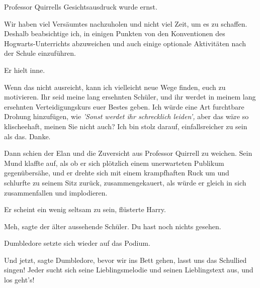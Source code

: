 Professor Quirrells Gesichtsausdruck wurde ernst.

\glqq Wir haben viel Versäumtes nachzuholen und nicht viel Zeit, um es zu
schaffen. Deshalb beabsichtige ich, in einigen Punkten von den Konventionen des
Hogwarts-Unterrichts abzuweichen und auch einige optionale Aktivitäten nach der
Schule einzuführen.\grqq{}

Er hielt inne.

\glqq Wenn das nicht ausreicht, kann ich vielleicht neue Wege finden, euch zu
motivieren. Ihr seid meine lang ersehnten Schüler, und ihr werdet in meinem lang
ersehnten Verteidigungskurs euer Bestes geben. Ich würde eine Art furchtbare
Drohung hinzufügen, wie
\emph{'Sonst werdet ihr schrecklich leiden',}
aber das wäre so klischeehaft, meinen Sie nicht auch? Ich bin stolz darauf,
einfallsreicher zu sein als das. Danke.\grqq{}

Dann schien der Elan und die Zuversicht aus Professor Quirrell zu weichen. Sein
Mund klaffte auf, als ob er sich plötzlich einem unerwarteten Publikum
gegenübersähe, und er drehte sich mit einem krampfhaften Ruck um und schlurfte
zu seinem Sitz zurück, zusammengekauert, als würde er gleich in sich
zusammenfallen und implodieren.

\glqq Er scheint ein wenig seltsam zu sein\grqq{}, flüsterte Harry.

\glqq Meh\grqq{}, sagte der älter aussehende Schüler. \glqq Du hast noch nichts
gesehen.\grqq{}

Dumbledore setzte sich wieder auf das Podium.

\glqq Und jetzt\grqq{}, sagte Dumbledore, \glqq bevor wir ins Bett gehen, lasst
uns das Schullied singen! Jeder sucht sich seine Lieblingsmelodie und seinen
Lieblingstext aus, und los geht's!\grqq{}